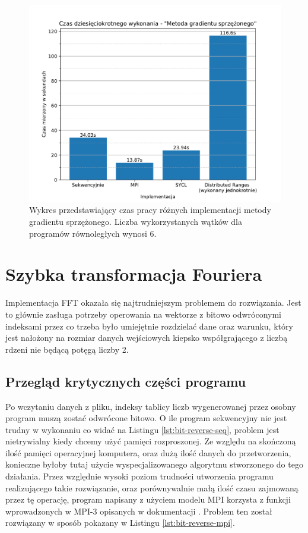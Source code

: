 \documentclass[a4paper,12pt]{book} %
\begin{document}
\begin{figure}
	\centering
	\includegraphics[scale=0.8]{assets/czas_wykonania_cg.pdf}
	\caption{Wykres przedstawiający czas pracy różnych implementacji metody gradientu sprzężonego. Liczba wykorzystanych wątków dla programów równoległych wynosi 6.}
	\label{fig:wykonanie-cg}
\end{figure}

\section{Szybka transformacja Fouriera}
Implementacja FFT okazała się najtrudniejszym problemem do rozwiązania. Jest to głównie zasługa potrzeby operowania na wektorze z bitowo odwróconymi indeksami przez co trzeba było umiejętnie rozdzielać dane oraz warunku, który jest nałożony na rozmiar danych wejściowych kiepsko współgrającego z liczbą rdzeni nie będącą potęgą liczby 2.
\subsection{Przegląd krytycznych części programu}
Po wczytaniu danych z pliku, indeksy tablicy liczb wygenerowanej przez osobny program muszą zostać odwrócone bitowo. O ile program sekwencyjny nie jest trudny w wykonaniu co widać na Listingu \ref{lst:bit-reverse-seq}, problem jest nietrywialny kiedy chcemy użyć pamięci rozproszonej. Ze względu na skończoną ilość pamięci operacyjnej komputera, oraz dużą ilość danych do przetworzenia, konieczne byłoby tutaj użycie wyspecjalizowanego algorytmu stworzonego do tego działania. Przez względnie wysoki poziom trudności utworzenia programu realizującego takie rozwiązanie, oraz porównywalnie małą ilość czasu zajmowaną przez tę operację, program napisany z użyciem modelu MPI korzysta z funkcji wprowadzonych w MPI-3 opisanych w dokumentacji \cite{mpi41}. Problem ten został rozwiązany w sposób pokazany w Listingu \ref{lst:bit-reverse-mpi}.
\end{document}
